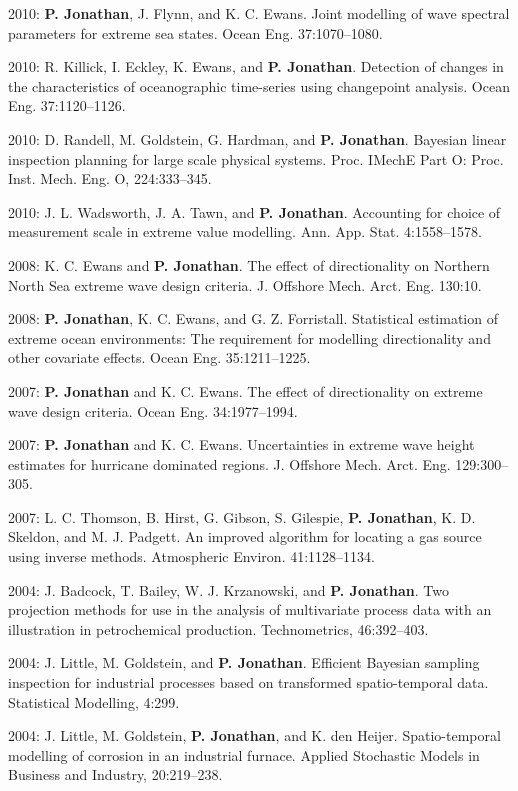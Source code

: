 \documentclass[11pt,a4paper]{moderncv}
\begin{document}
2010: \textbf{P. Jonathan}, J. Flynn, and K. C. Ewans. Joint modelling of wave spectral parameters for extreme sea states. Ocean Eng. 37:1070--1080.

2010: R. Killick, I. Eckley, K. Ewans, and \textbf{P. Jonathan}. Detection of changes in the characteristics of oceanographic time-series using changepoint analysis. Ocean Eng. 37:1120--1126.

2010: D. Randell, M. Goldstein, G. Hardman, and \textbf{P. Jonathan}. Bayesian linear inspection planning for large scale physical systems. Proc. IMechE Part O: Proc. Inst. Mech. Eng. O, 224:333--345.

2010: J. L. Wadsworth, J. A. Tawn, and \textbf{P. Jonathan}. Accounting for choice of measurement scale in extreme value modelling. Ann. App. Stat. 4:1558--1578.

2008: K. C. Ewans and \textbf{P. Jonathan}. The effect of directionality on Northern North Sea extreme wave design criteria. J. Offshore Mech. Arct. Eng. 130:10.

2008: \textbf{P. Jonathan}, K. C. Ewans, and G. Z. Forristall. Statistical estimation of extreme ocean environments: The requirement for modelling directionality and other covariate effects. Ocean Eng. 35:1211--1225.

2007: \textbf{P. Jonathan} and K. C. Ewans. The effect of directionality on extreme wave design criteria. Ocean Eng. 34:1977--1994.

2007: \textbf{P. Jonathan} and K. C. Ewans. Uncertainties in extreme wave height estimates for hurricane dominated regions. J. Offshore Mech. Arct. Eng. 129:300--305.

2007: L. C. Thomson, B. Hirst, G. Gibson, S. Gilespie, \textbf{P. Jonathan}, K. D. Skeldon, and M. J. Padgett. An improved algorithm for locating a gas source using inverse methods. Atmospheric Environ. 41:1128--1134.

2004: J. Badcock, T. Bailey, W. J. Krzanowski, and \textbf{P. Jonathan}. Two projection methods for use in the analysis of multivariate process data with an illustration in petrochemical production. Technometrics, 46:392--403.

2004: J. Little, M. Goldstein, and \textbf{P. Jonathan}. Efficient Bayesian sampling inspection for industrial processes based on transformed spatio-temporal data. Statistical Modelling, 4:299.

2004: J. Little, M. Goldstein, \textbf{P. Jonathan}, and K. den Heijer. Spatio-temporal modelling of corrosion in an industrial furnace. Applied Stochastic Models in Business and Industry, 20:219--238.
\end{document}

